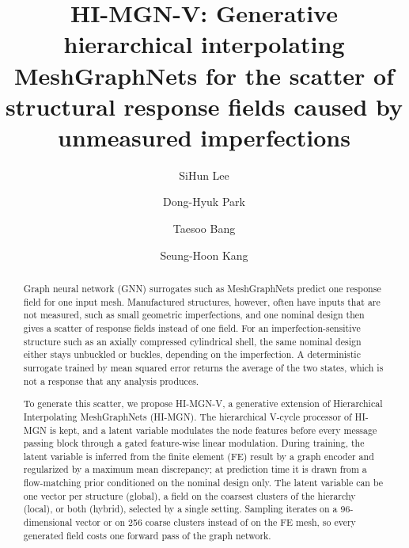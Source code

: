 \documentclass[preprint,12pt]{elsarticle}
\begin{document}
\begin{frontmatter}

\title{HI-MGN-V: Generative hierarchical interpolating MeshGraphNets for the scatter of structural response fields caused by unmeasured imperfections}

\author[1]{SiHun Lee}
\author[2]{Dong-Hyuk Park}
\author[2]{Taesoo Bang}
\author[2]{Seung-Hoon Kang}


\begin{abstract}
Graph neural network (GNN) surrogates such as MeshGraphNets predict one response field for one
input mesh. Manufactured structures, however, often have inputs that are not measured, such as
small geometric imperfections, and one nominal design then gives a scatter of response fields
instead of one field. For an imperfection-sensitive structure such as an axially compressed
cylindrical shell, the same nominal design either stays unbuckled or buckles, depending on the
imperfection. A deterministic surrogate trained by mean squared error returns the average of the
two states, which is not a response that any analysis produces.

To generate this scatter, we propose HI-MGN-V, a generative extension of Hierarchical
Interpolating MeshGraphNets (HI-MGN). The hierarchical V-cycle processor of HI-MGN is kept, and
a latent variable modulates the node features before every message passing block through a gated
feature-wise linear modulation. During training, the latent variable is inferred from the finite
element (FE) result by a graph encoder and regularized by a maximum mean discrepancy; at
prediction time it is drawn from a flow-matching prior conditioned on the nominal design only.
The latent variable can be one vector per structure (global), a field on the coarsest clusters
of the hierarchy (local), or both (hybrid), selected by a single setting. Sampling iterates on
a 96-dimensional vector or on 256 coarse clusters instead of on the FE mesh, so every generated
field costs one forward pass of the graph network.


\end{abstract}
\end{frontmatter}
\end{document}
